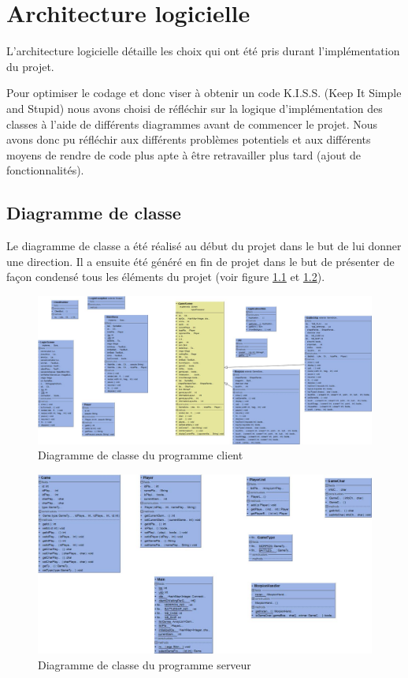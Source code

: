 \documentclass{report}
\begin{document}
\chapter{Architecture logicielle}
L'architecture logicielle détaille les choix qui ont été pris durant l'implémentation du projet.

Pour optimiser le codage et donc viser à obtenir un code K.I.S.S. (Keep It Simple and Stupid) nous avons choisi de réfléchir sur la logique d'implémentation
des classes à l'aide de différents diagrammes avant de commencer le projet. Nous avons donc pu réfléchir
aux différents problèmes potentiels et aux différents moyens de rendre de code plus apte à être retravailler plus tard (ajout de fonctionnalités).

\section{Diagramme de classe}
Le diagramme de classe a été réalisé au début du projet dans le but de lui donner une direction. Il a ensuite été généré en fin de projet
dans le but de présenter de façon condensé tous les éléments du projet (voir figure \ref{diagramme de classe client figure} et \ref{diagramme de classe serveur figure}).

\begin{figure}[H]
	\centering\includegraphics[width=15cm]{classdiagrammclient}
	\caption{Diagramme de classe du programme client}
  \label{diagramme de classe client figure}
\end{figure}

\begin{figure}[H]
	\centering\includegraphics[width=15cm]{classdiagrammserver}
	\caption{Diagramme de classe du programme serveur}
  \label{diagramme de classe serveur figure}
\end{figure}
\end{document}
